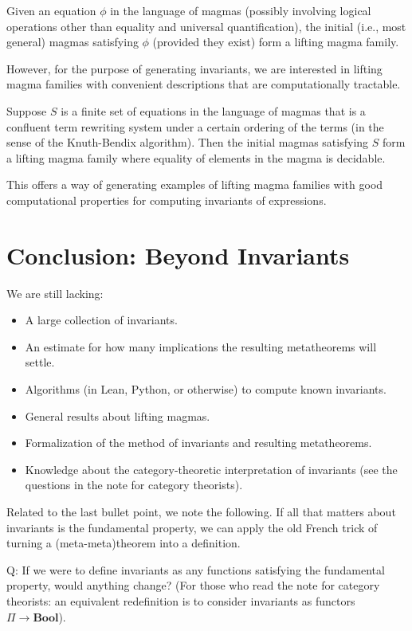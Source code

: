 \begin{remark}
	Given an equation $\phi$ in the language of magmas (possibly involving logical operations other than equality and universal quantification), the initial (i.e., most general) magmas satisfying $\phi$ (provided they exist) form a lifting magma family.

	However, for the purpose of generating invariants, we are interested in lifting magma families with convenient descriptions that are computationally tractable.
\end{remark}

\begin{remark}
	Suppose $S$ is a finite set of equations in the language of magmas that is a confluent term rewriting system under a certain ordering of the terms (in the sense of the Knuth-Bendix algorithm). Then the initial magmas satisfying $S$ form a lifting magma family where equality of elements in the magma is decidable.

	This offers a way of generating examples of lifting magma families with good computational properties for computing invariants of expressions.
\end{remark}


\section{Conclusion: Beyond Invariants}
We are still lacking:
\begin{itemize}
	\item A large collection of invariants.
	\item An estimate for how many implications the resulting metatheorems will settle.
	\item Algorithms (in Lean, Python, or otherwise) to compute known invariants.
	\item General results about lifting magmas.
	\item Formalization of the method of invariants and resulting metatheorems.
	\item Knowledge about the category-theoretic interpretation of invariants (see the questions in the note for category theorists).
\end{itemize}

Related to the last bullet point, we note the following. If all that matters about invariants is the fundamental property, we can apply the old French trick of turning a (meta-meta)theorem into a definition.

Q: If we were to define invariants as any functions satisfying the fundamental property, would anything change? (For those who read the note for category theorists: an equivalent redefinition is to consider invariants as functors $\Pi \to \textbf{Bool}$).
